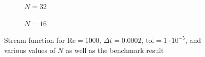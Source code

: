 \begin{figure}[p]
    \vspace{1cm}
    
    \begin{subfigure}[b]{0.49\textwidth}
	    \caption{$N = 32$}
    	\label{fig:sfe}
    \end{subfigure}
    \begin{subfigure}[b]{0.49\textwidth}
	    \caption{$N = 16$}
    	\label{fig:sff}
    \end{subfigure}
    \caption{Stream function for $\text{Re} = 1000$, $\Delta t = 0.0002$, $\text{tol} = 1 \cdot 10^{-5}$, and various values of $N$ as well as the benchmark result}
    \label{fig:allsf}
\end{figure}

